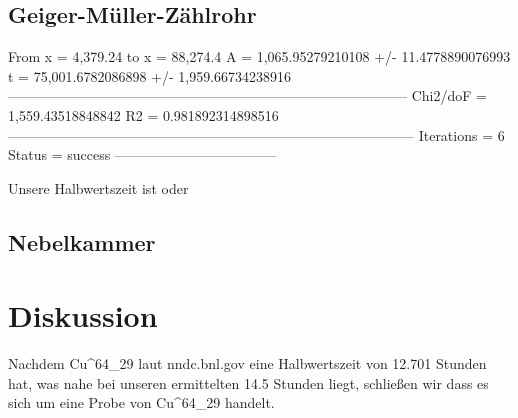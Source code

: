 \documentclass{article}
\begin{document}
\subsection{Geiger-Müller-Zählrohr}
From x = 4,379.24 to x = 88,274.4
A  = 1,065.95279210108 +/- 11.4778890076993
t  = 75,001.6782086898 +/- 1,959.66734238916
--------------------------------------------------------------------------------------
Chi2/doF = 1,559.43518848842
R2 = 0.981892314898516
---------------------------------------------------------------------------------------
Iterations = 6
Status = success
-----------------------------------

Unsere Halbwertszeit ist  oder \\
\subsection{Nebelkammer}
\section{Diskussion}		
Nachdem Cu^{64}_{29} laut nndc.bnl.gov eine Halbwertszeit von 12.701 Stunden hat, was nahe bei unseren ermittelten 14.5 Stunden liegt, schließen wir dass es sich um eine Probe von Cu^{64}_{29} handelt.																		
\end{document}
